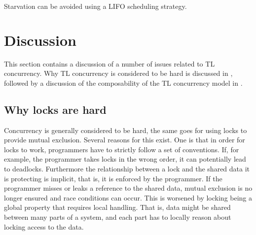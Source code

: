 Starvation can be avoided using a \ac{LIFO} scheduling strategy\cite[p. 459]{tanenbaum2008modern}.

\section{Discussion}
\label{sec:tl_discussion}
This section contains a discussion of a number of issues related to \ac{TL} concurrency. Why \ac{TL} concurrency is considered to be hard is discussed in , followed by a discussion of the composability of the \ac{TL} concurrency model in .
\subsection{Why locks are hard}\label{subsec:tl_lock_hard}
Concurrency is generally considered to be hard, the same goes for using locks to provide mutual exclusion\cite[p. 56]{sutter2005software}. Several reasons for this exist. One is that in order for locks to work, programmers have to strictly follow a set of conventions. If, for example, the programmer takes locks in the wrong order, it can potentially lead to deadlocks\cite[p. 58]{sutter2005software}. Furthermore the relationship between a lock and the shared data it is protecting is implicit, that is, it is enforced by the programmer. If the programmer misses or leaks a reference to the shared data, mutual exclusion is no longer ensured and race conditions can occur. This is worsened by locking being a global property that requires local handling. That is, data might be shared between many parts of a system, and each part has to locally reason about locking access to the data.

